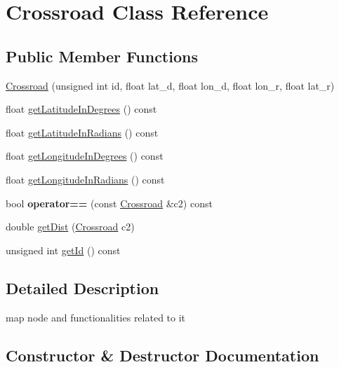 \hypertarget{class_crossroad}{}\section{Crossroad Class Reference}
\label{class_crossroad}
\subsection*{Public Member Functions}
\begin{DoxyCompactItemize}
\item 
\hyperlink{class_crossroad_ad382cd4797d691a388f5dae7ad2aa7e1}{Crossroad} (unsigned int id, float lat\+\_\+d, float lon\+\_\+d, float lon\+\_\+r, float lat\+\_\+r)
\item 
float \hyperlink{class_crossroad_a089ec6f57ec1535c5382aa970542f0a7}{get\+Latitude\+In\+Degrees} () const 
\item 
float \hyperlink{class_crossroad_a9dfa221519cd05a3562ebab44df7cedc}{get\+Latitude\+In\+Radians} () const 
\item 
float \hyperlink{class_crossroad_aaf1bace7c2be7fcf009e3b3e05de87c7}{get\+Longitude\+In\+Degrees} () const 
\item 
float \hyperlink{class_crossroad_afeb5ebed1f9df93e54a5e3f1395fc980}{get\+Longitude\+In\+Radians} () const 
\item 
bool {\bfseries operator==} (const \hyperlink{class_crossroad}{Crossroad} \&c2) const \hypertarget{class_crossroad_abd6140071d0b179dc1dd54fa7ce03768}{}\label{class_crossroad_abd6140071d0b179dc1dd54fa7ce03768}

\item 
double \hyperlink{class_crossroad_ae118c0ada6b191335a6e0f0fdce1e0d5}{get\+Dist} (\hyperlink{class_crossroad}{Crossroad} c2)
\item 
unsigned int \hyperlink{class_crossroad_a81e112365e77a43a729fd807538bd339}{get\+Id} () const 
\end{DoxyCompactItemize}


\subsection{Detailed Description}
map node and functionalities related to it 

\subsection{Constructor \& Destructor Documentation}
